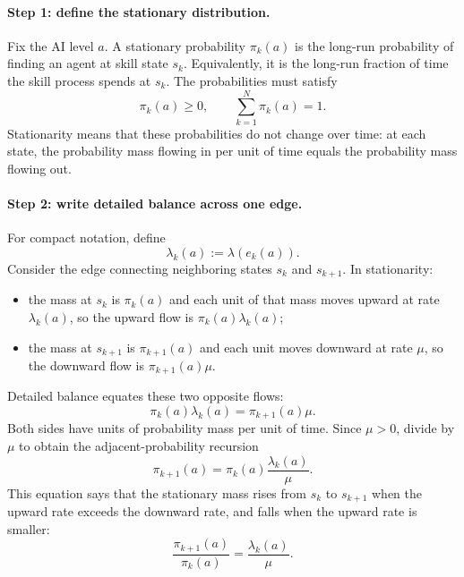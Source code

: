 \documentclass[11pt]{article}
\theoremstyle{tutorial}
\theoremstyle{remark}
\newcommand{\1}{\mathbb{I}}
\begin{document}
\paragraph{Step 1: define the stationary distribution.}
Fix the AI level $a$.  A stationary probability $\pi_k(a)$ is the long-run probability of finding an agent
at skill state $s_k$.  Equivalently, it is the long-run fraction of time the skill process spends at $s_k$.
The probabilities must satisfy
\[
  \pi_k(a)\ge0,
  \qquad
  \sum_{k=1}^N\pi_k(a)=1.
\]
Stationarity means that these probabilities do not change over time: at each state, the probability mass
flowing in per unit of time equals the probability mass flowing out.

\paragraph{Step 2: write detailed balance across one edge.}
For compact notation, define
\[
  \lambda_k(a):=\lambda(e_k(a)).
\]
Consider the edge connecting neighboring states $s_k$ and $s_{k+1}$.  In stationarity:
\begin{itemize}
  \item the mass at $s_k$ is $\pi_k(a)$ and each unit of that mass moves upward at rate $\lambda_k(a)$,
  so the upward flow is $\pi_k(a)\lambda_k(a)$;
  \item the mass at $s_{k+1}$ is $\pi_{k+1}(a)$ and each unit moves downward at rate $\mu$, so the
  downward flow is $\pi_{k+1}(a)\mu$.
\end{itemize}
Detailed balance equates these two opposite flows:
\begin{equation}
  \boxed{\pi_k(a)\lambda_k(a)=\pi_{k+1}(a)\mu.}
  \label{eq:edge-detailed-balance}
\end{equation}
Both sides have units of probability mass per unit of time.  Since $\mu>0$, divide by $\mu$ to obtain the
adjacent-probability recursion
\begin{equation}
  \boxed{\pi_{k+1}(a)=\pi_k(a)\frac{\lambda_k(a)}{\mu}.}
  \label{eq:stationary-recursion}
\end{equation}
This equation says that the stationary mass rises from $s_k$ to $s_{k+1}$ when the upward rate exceeds the
downward rate, and falls when the upward rate is smaller:
\[
  \frac{\pi_{k+1}(a)}{\pi_k(a)}
  =\frac{\lambda_k(a)}{\mu}.
\]
\end{document}
